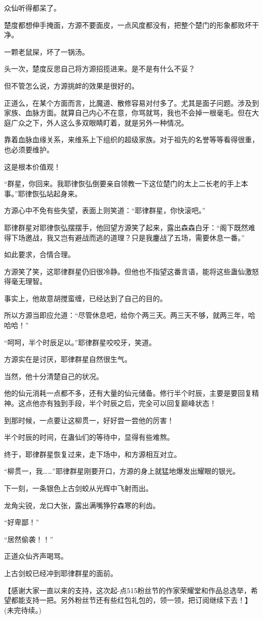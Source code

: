 \begin{this_body}
众仙听得都呆了。

楚度都想伸手掩面，方源不要面皮，一点风度都没有，把整个楚门的形象都败坏干净。

一颗老鼠屎，坏了一锅汤。

头一次，楚度反思自己将方源招揽进来。是不是有什么不妥？

但不管怎么说，方源挑衅的效果是很好的。

正道么，在某个方面而言，比魔道、散修容易对付多了。尤其是面子问题。涉及到家族、血脉方面。就算自己内心不在意，你骂就骂，我也不会掉一根毫毛。但在大庭广众之下，外人这么多双眼睛盯着，就是另外一种情况。

靠着血脉血缘关系，来维系上下组织的超级家族。对于祖先的名誉等等看得很重，也必须要维护。

这是根本价值观！

“群星，你回来。我耶律恢弘倒要亲自领教一下这位楚门的太上二长老的手上本事。”耶律恢弘站起身来。

方源心中不免有些失望，表面上则笑道：“耶律群星，你快滚吧。”

耶律群星对耶律恢弘摆摆手，他回望方源笑了起来，露出森森白牙：“阁下既然难得下场邀战，我又岂有避战而逃的道理？只是我鏖战了五场，需要休息一番。”

如此要求，合情合理。

方源笑了笑，这耶律群星仍旧很冷静。但他也不指望这番言语，能将这些蛊仙激怒得毫无理智。

事实上，他故意胡搅蛮缠，已经达到了自己的目的。

所以方源当即应允道：“尽管休息吧，给你个两三天。两三天不够，就两三年，哈哈哈！”

“呵呵，半个时辰足以。”耶律群星咬咬牙，笑道。

方源实在是讨厌，耶律群星自然很生气。

当然，他十分清楚自己的状况。

他的仙元消耗一点都不多，还有大量的仙元储备。修行半个时辰，主要是要回复精神。这点他亦有独到手段，半个时辰之后，完全可以回复巅峰状态！

到那时候，一点要让这柳贯一，好好尝一尝他的厉害！

半个时辰的时间，在蛊仙们的等待中，显得有些难熬。

终于，耶律群星恢复过来，走下场中，和方源相互对立。

“柳贯一，我……”耶律群星刚要开口，方源的身上就猛地爆发出耀眼的银光。

下一刻，一条银色上古剑蛟从光辉中飞射而出。

龙角尖锐，龙口大张，露出满嘴狰狞森寒的利齿。

“好卑鄙！”

“居然偷袭！！”

正道众仙齐声喝骂。

上古剑蛟已经冲到耶律群星的面前。

【感谢大家一直以来的支持，这次起-点515粉丝节的作家荣耀堂和作品总选举，希望都能支持一把。另外粉丝节还有些红包礼包的，领一领，把订阅继续下去！】(未完待续。)

\end{this_body}

